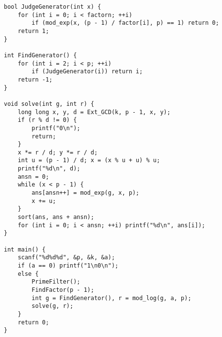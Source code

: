\begin{verbatim}
bool JudgeGenerator(int x) {
    for (int i = 0; i < factorn; ++i)
        if (mod_exp(x, (p - 1) / factor[i], p) == 1) return 0;
    return 1;
}

int FindGenerator() {
    for (int i = 2; i < p; ++i)
        if (JudgeGenerator(i)) return i;
    return -1;
}

void solve(int g, int r) {
    long long x, y, d = Ext_GCD(k, p - 1, x, y);
    if (r % d != 0) {
        printf("0\n");
        return;
    }
    x *= r / d; y *= r / d;
    int u = (p - 1) / d; x = (x % u + u) % u;
    printf("%d\n", d);
    ansn = 0;
    while (x < p - 1) {
        ans[ansn++] = mod_exp(g, x, p);
        x += u;
    }
    sort(ans, ans + ansn);
    for (int i = 0; i < ansn; ++i) printf("%d\n", ans[i]);
}

int main() {
    scanf("%d%d%d", &p, &k, &a);
    if (a == 0) printf("1\n0\n");
    else {
        PrimeFilter();
        FindFactor(p - 1);
        int g = FindGenerator(), r = mod_log(g, a, p);
        solve(g, r);
    }
    return 0;
}
\end{verbatim}
